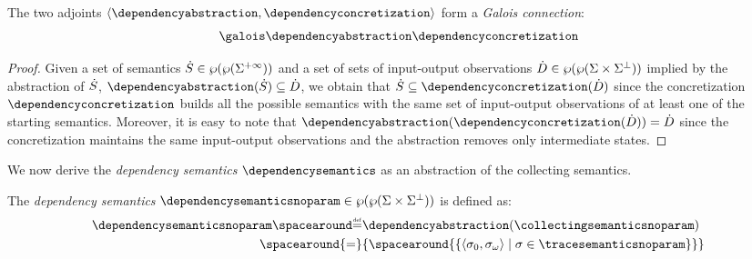 \begin{theorem}
The two adjoints $\tuple{\dependencyabstraction}{\dependencyconcretization}$ form a \emph{Galois connection}:
\begin{align*}
  \galoisbetweensemantics{collecting}{dependency}
\end{align*}
\end{theorem}
\begin{proof}
  Given a set of semantics $\dot{S}\in\wp(\wp(\Sigma^{+\infty}))$ and a set of sets of input-output observations $\dot{D}\in\wp(\wp(\Sigma\times\Sigma^\bot))$ implied by the abstraction of $\dot{S}$, $\dependencyabstraction(\defsetofsetoftraces)\subseteq \defsetofsetofdependencies$, we obtain that $\defsetofsetoftraces\subseteq\dependencyconcretization(\defsetofsetofdependencies)$ since the concretization $\dependencyconcretization$ builds all the possible semantics with the same set of input-output observations of at least one of the starting semantics.
  Moreover, it is easy to note that $\dependencyabstraction(\dependencyconcretization(\defsetofsetofdependencies)) = \defsetofsetofdependencies$ since the concretization maintains the same input-output observations and the abstraction removes only intermediate states.
\end{proof}

We now derive the \emph{dependency semantics} $\dependencysemantics$ as an abstraction of the collecting semantics.

\begin{definition}
  The \emph{dependency semantics} $\dependencysemanticsnoparam\in\dependencytype$ is defined as:
  \begin{align*}
    \dependencysemanticsnoparam\DefeQ& \dependencyabstraction(\collectingsemanticsnoparam) \\
    \spacearound{=}& \{\spacearound{\setdef{\inputoutputtuple{\deftrace}}{\deftrace \in \tracesemanticsnoparam}}\}
  \end{align*}
\end{definition}

